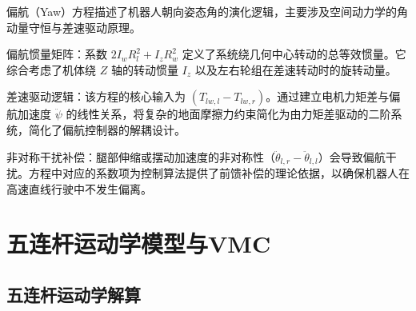偏航（Yaw）方程描述了机器人朝向姿态角的演化逻辑，主要涉及空间动力学的角动量守恒与差速驱动原理。

偏航惯量矩阵：系数 $2I_w R_{l}^{2} + I_z R_{w}^{2}$ 定义了系统绕几何中心转动的总等效惯量。它综合考虑了机体绕 $Z$ 轴的转动惯量 $I_z$ 以及左右轮组在差速转动时的旋转动量。

差速驱动逻辑：该方程的核心输入为 $(T_{lw,l} - T_{lw,r})$。通过建立电机力矩差与偏航加速度 $\ddot{\psi}$ 的线性关系，将复杂的地面摩擦力约束简化为由力矩差驱动的二阶系统，简化了偏航控制器的解耦设计。

非对称干扰补偿：腿部伸缩或摆动加速度的非对称性（$\ddot{\theta}_{l,r} - \ddot{\theta}_{l,l}$）会导致偏航干扰。方程中对应的系数项为控制算法提供了前馈补偿的理论依据，以确保机器人在高速直线行驶中不发生偏离。

\section{五连杆运动学模型与VMC}

\subsection{五连杆运动学解算}

